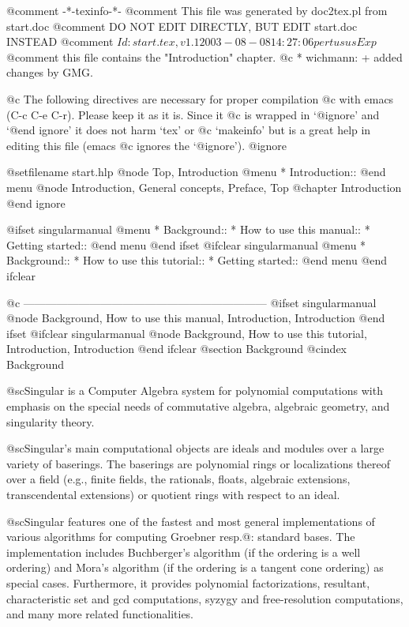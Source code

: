 @comment -*-texinfo-*-
@comment This file was generated by doc2tex.pl from start.doc
@comment DO NOT EDIT DIRECTLY, BUT EDIT start.doc INSTEAD
@comment $Id: start.tex,v 1.1 2003-08-08 14:27:06 pertusus Exp $
@comment this file contains the "Introduction" chapter.
@c * wichmann: + added changes by GMG.

@c The following directives are necessary for proper compilation
@c with emacs (C-c C-e C-r).  Please keep it as it is.  Since it
@c is wrapped in `@ignore' and `@end ignore' it does not harm `tex' or
@c `makeinfo' but is a great help in editing this file (emacs
@c ignores the `@ignore').
@ignore

@setfilename start.hlp
@node Top, Introduction
@menu
* Introduction::
@end menu
@node Introduction, General concepts, Preface, Top
@chapter Introduction
@end ignore


@ifset singularmanual
@menu
* Background::
* How to use this manual::
* Getting started::
@end menu
@end ifset
@ifclear singularmanual
@menu
* Background::
* How to use this tutorial::
* Getting started::
@end menu
@end ifclear

@c ------------------------------------------------------------------
@ifset singularmanual
@node Background, How to use this manual, Introduction, Introduction
@end ifset
@ifclear singularmanual
@node Background, How to use this tutorial, Introduction, Introduction
@end ifclear
@section Background
@cindex Background

@sc{Singular} is a Computer Algebra system for polynomial
computations with emphasis on the special needs of commutative
algebra, algebraic geometry, and singularity theory.

@sc{Singular}'s main computational objects are ideals and
modules over a large variety of baserings. The baserings are polynomial
rings or localizations thereof over a field (e.g., finite fields, the
rationals, floats, algebraic extensions, transcendental extensions) or
quotient rings with respect to an ideal.

@sc{Singular} features one of the fastest and most general
implementations of various algorithms for computing Groebner
resp.@: standard bases. The implementation includes Buchberger's algorithm
(if the ordering is a well ordering) and Mora's algorithm (if the
ordering is a tangent cone ordering) as special cases.  Furthermore, it
provides polynomial factorizations, resultant, characteristic set and
gcd computations, syzygy and free-resolution computations, and many more
related functionalities.

